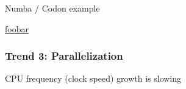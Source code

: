 \documentclass[
    xcolor={svgnames,dvipsnames},
    hyperref={colorlinks, citecolor=DeepPink4, linkcolor=DarkRed, urlcolor=DarkBlue}
    ]{beamer}  %
\newcommand{\1}{\mathbbm 1}
\begin{document}
\begin{frame}

    Numba / Codon example

    \url{foobar}

\end{frame}



    

\begin{frame}

    \frametitle{Trend 3: Parallelization}

    CPU frequency (clock speed) growth is slowing

    \begin{figure}
       \begin{center}
       \end{center}
    \end{figure}

\end{frame}
\end{document}
